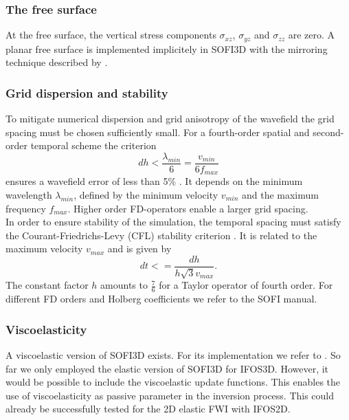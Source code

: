 \subsubsection*{The free surface}
At the free surface, the vertical stress components $\sigma_{xz}$, $\sigma_{yz}$ and  $\sigma_{zz}$ are zero. A planar free surface is implemented implicitely in SOFI3D with the mirroring technique described by \cite{Lev88}.
\subsubsection*{Grid dispersion and stability} 
To mitigate numerical dispersion and grid anisotropy of the wavefield the grid spacing must be chosen sufficiently small. For a fourth-order spatial and second-order temporal scheme the criterion 
\begin{equation}
 dh < \frac{\lambda_{min}}{6}=\frac{v_{min}}{6f_{max}} \label{equ:grid_disp}
\end{equation}
ensures a wavefield error of less than 5\% \citep{boh02}. It depends on the minimum wavelength $\lambda_{min}$, defined by the minimum velocity $v_{min}$ and the maximum frequency $f_{max}$.  Higher order FD-operators enable a larger grid spacing.\\
In order to ensure stability of the simulation, the temporal spacing must satisfy the Courant-Friedrichs-Levy (CFL) stability criterion \citep{Cou67}. It is related to the maximum velocity $v_{max}$ and is given by
\begin{equation}
 dt<=\frac{dh}{h\sqrt{3}v_{max}}.
\end{equation}
The constant factor $h$ amounts to $\frac{7}{6}$ for a Taylor operator of fourth order. For different FD orders and Holberg coefficients we refer to the SOFI manual.
\subsubsection*{Viscoelasticity}
A viscoelastic version of SOFI3D exists. For its implementation we refer to \cite{boh02}. So far we only employed the elastic version of SOFI3D for IFOS3D. However, it would be possible to include the viscoelastic update functions. This enables the use of viscoelasticity as passive parameter in the inversion process. This could already be successfully tested for the 2D elastic FWI with IFOS2D.	
